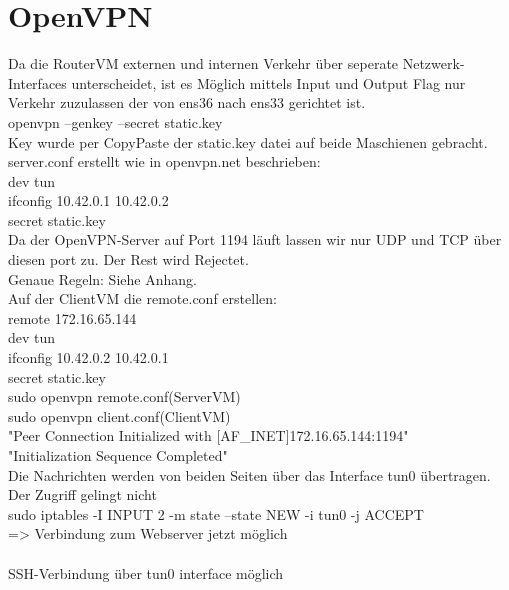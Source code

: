 \documentclass[12pt]{article}
\theoremstyle{plain}
\begin{document}
\section{OpenVPN}
Da die RouterVM externen und internen Verkehr über seperate Netzwerk-Interfaces unterscheidet, ist es Möglich mittels Input und Output Flag nur Verkehr zuzulassen der von ens36 nach ens33 gerichtet ist.\\
openvpn --genkey --secret static.key\\
Key wurde per CopyPaste der static.key datei auf beide Maschienen gebracht.\\
server.conf erstellt wie in openvpn.net beschrieben:\\
dev tun\\
ifconfig 10.42.0.1 10.42.0.2\\
secret static.key\\
Da der OpenVPN-Server auf Port 1194 läuft lassen wir nur UDP und TCP über diesen port zu. Der Rest wird Rejectet.\\
Genaue Regeln: Siehe Anhang.\\
Auf der ClientVM die remote.conf erstellen:\\
remote 172.16.65.144\\
dev tun\\
ifconfig 10.42.0.2 10.42.0.1\\
secret static.key\\
sudo openvpn remote.conf(ServerVM)\\
sudo openvpn client.conf(ClientVM)\\
"Peer Connection Initialized with [AF\_INET]172.16.65.144:1194"\\
"Initialization Sequence Completed"\\
Die Nachrichten werden von beiden Seiten über das Interface tun0 übertragen.\\
Der Zugriff gelingt nicht\\
sudo iptables -I INPUT 2 -m state --state NEW -i tun0 -j ACCEPT\\
=> Verbindung zum Webserver jetzt möglich\\\\
SSH-Verbindung über tun0 interface möglich\\
\end{document}
